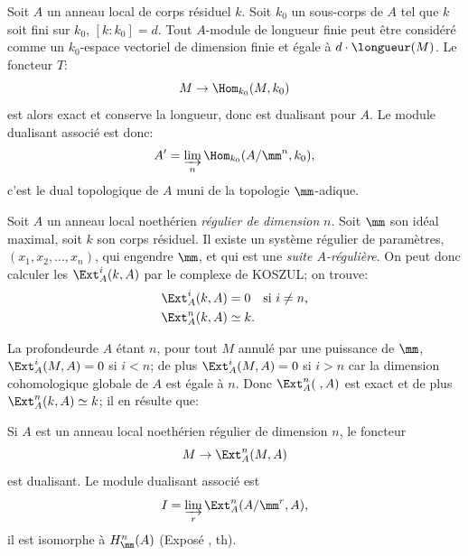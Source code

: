 \begin{exemple}[MACAULAY]
\label{IV.5.2} Soit $A$ un anneau local de corps r\'esiduel $k$. Soit $k_{0}$ un sous-corps de $A$ tel que $k$ soit fini sur $k_{0}$, $[k:k_{0}]=d$. Tout $A$-module de longueur finie peut \^etre consid\'er\'e comme un $k_{0}$-espace vectoriel de dimension finie et \'egale \`a $d\cdot\longueur(M)$. Le foncteur $T$:
$$
M\to \Hom_{k_{0}}(M, k_{0})
$$
est alors exact et conserve la longueur, donc est dualisant pour $A$. Le module dualisant associ\'e est donc:
$$
A'=\varinjlim_{n}\Hom_{k_{0}}(A/\mm^{n}, k_{0}),
$$
c'est le dual topologique de $A$ muni de la topologie $\mm$-adique.
\end{exemple}

\begin{exemple} \label{IV.5.3}
Soit $A$ un anneau local noeth\'erien \emph{r\'egulier de dimension} $n$. Soit $\mm$ son id\'eal maximal, soit $k$ son corps r\'esiduel. Il existe un syst\`eme r\'egulier de param\`etres, $(x_{1}, x_{2}, \ldots, x_{n})$, qui engendre $\mm$, et qui est une \emph{suite $A$-r\'eguli\`ere}. On peut donc calculer les $\Ext^{i}_{A}(k, A)$ par le complexe de KOSZUL; on trouve:
\begin{align*}
\Ext^{i}_{A}(k, A)&=0\quad \text{si } i\neq n,\\
\Ext^{n}_{A}(k, A)&\simeq k.
\end{align*}

La profondeur\pageoriginale de $A$ \'etant $n$, pour tout $M$ annul\'e par une puissance de $\mm$, $\Ext^{i}_{A}(M, A)=0$ si $i<n$; de plus $\Ext^{i}_{A}(M, A)=0$ si $i>n$ car la dimension cohomologique globale de $A$ est \'egale \`a $n$. Donc $\Ext^{n}_{A}(\;, A)$ est exact et de plus $\Ext^{n}_{A}(k, A)\simeq k$; il en r\'esulte que:
\end{exemple}

\begin{proposition} \label{IV.5.4}
Si $A$ est un anneau local noeth\'erien r\'egulier de dimension $n$, le foncteur
$$
M\to \Ext_{A}^{n}(M, A)
$$
est dualisant. Le module dualisant associ\'e est
$$
I=\varinjlim_{r}\Ext_{A}^{n}(A/\mm^{r}, A),
$$
il est isomorphe \`a $H^{n}_{\mm}(A)$ (Expos\'e , th\ptbl {}).
\end{proposition}

